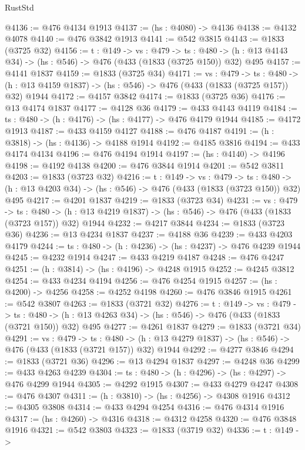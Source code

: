 \begin{lexlean}{RustStd}
\begin{coremodule}
@4136 := @476 @4134 @1913
@4137 := (hs : @4080) -> @4136
@4138 := @4132 @4078
@4140 := @476 @3842 @1913
@4141 := @542 @3815
@4143 := @1833 (@3725 @32)
@4156 := {t : @149} ->
  {vs : @479} ->
  {ts : @480} -> (h : @13 @4143 @34) -> (hs : @546) -> @476 (@433 (@1833 (@3725 @150)) @32) @495
@4157 := @4141 @1837
@4159 := @1833 (@3725 @34)
@4171 := {vs : @479} ->
  {ts : @480} -> (h : @13 @4159 @1837) -> (hs : @546) -> @476 (@433 (@1833 (@3725 @157)) @32) @1944
@4172 := @4157 @3842
@4174 := @1833 (@3725 @36)
@4176 := @13 @4174 @1837
@4177 := @4128 @36
@4179 := @433 @4143 @4119
@4184 := {ts : @480} -> (h : @4176) -> (hs : @4177) -> @476 @4179 @1944
@4185 := @4172 @1913
@4187 := @433 @4159 @4127
@4188 := @476 @4187
@4191 := (h : @3818) -> (hs : @4136) -> @4188 @1914
@4192 := @4185 @3816
@4194 := @433 @4174 @4134
@4196 := @476 @4194 @1914
@4197 := (hs : @4140) -> @4196
@4198 := @4192 @4138
@4200 := @476 @3844 @1914
@4201 := @542 @3811
@4203 := @1833 (@3723 @32)
@4216 := {t : @149} ->
  {vs : @479} ->
  {ts : @480} -> (h : @13 @4203 @34) -> (hs : @546) -> @476 (@433 (@1833 (@3723 @150)) @32) @495
@4217 := @4201 @1837
@4219 := @1833 (@3723 @34)
@4231 := {vs : @479} ->
  {ts : @480} -> (h : @13 @4219 @1837) -> (hs : @546) -> @476 (@433 (@1833 (@3723 @157)) @32) @1944
@4232 := @4217 @3844
@4234 := @1833 (@3723 @36)
@4236 := @13 @4234 @1837
@4237 := @4188 @36
@4239 := @433 @4203 @4179
@4244 := {ts : @480} -> (h : @4236) -> (hs : @4237) -> @476 @4239 @1944
@4245 := @4232 @1914
@4247 := @433 @4219 @4187
@4248 := @476 @4247
@4251 := (h : @3814) -> (hs : @4196) -> @4248 @1915
@4252 := @4245 @3812
@4254 := @433 @4234 @4194
@4256 := @476 @4254 @1915
@4257 := (hs : @4200) -> @4256
@4258 := @4252 @4198
@4260 := @476 @3846 @1915
@4261 := @542 @3807
@4263 := @1833 (@3721 @32)
@4276 := {t : @149} ->
  {vs : @479} ->
  {ts : @480} -> (h : @13 @4263 @34) -> (hs : @546) -> @476 (@433 (@1833 (@3721 @150)) @32) @495
@4277 := @4261 @1837
@4279 := @1833 (@3721 @34)
@4291 := {vs : @479} ->
  {ts : @480} -> (h : @13 @4279 @1837) -> (hs : @546) -> @476 (@433 (@1833 (@3721 @157)) @32) @1944
@4292 := @4277 @3846
@4294 := @1833 (@3721 @36)
@4296 := @13 @4294 @1837
@4297 := @4248 @36
@4299 := @433 @4263 @4239
@4304 := {ts : @480} -> (h : @4296) -> (hs : @4297) -> @476 @4299 @1944
@4305 := @4292 @1915
@4307 := @433 @4279 @4247
@4308 := @476 @4307
@4311 := (h : @3810) -> (hs : @4256) -> @4308 @1916
@4312 := @4305 @3808
@4314 := @433 @4294 @4254
@4316 := @476 @4314 @1916
@4317 := (hs : @4260) -> @4316
@4318 := @4312 @4258
@4320 := @476 @3848 @1916
@4321 := @542 @3803
@4323 := @1833 (@3719 @32)
@4336 := {t : @149} ->

\end{coremodule}
\end{lexlean}
